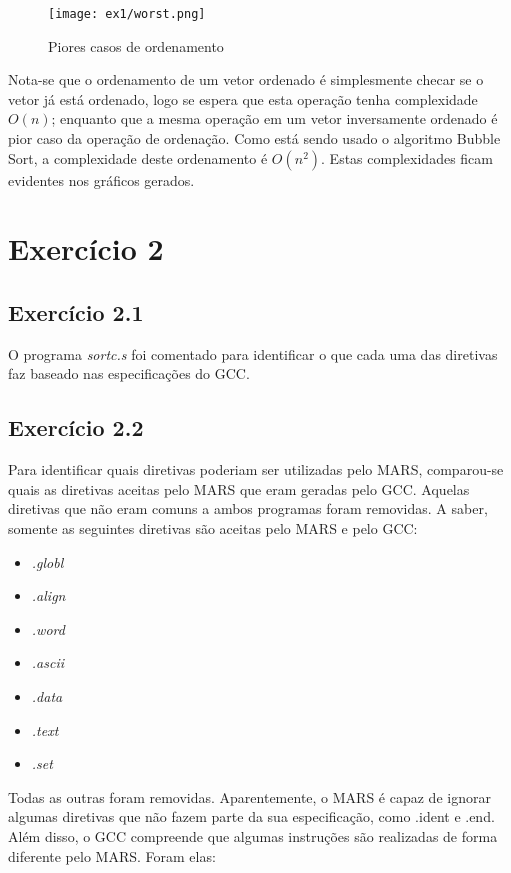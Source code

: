\documentclass[12pt, a4paper, twoside]{article}
\begin{document}
{\begin{figure}
    \centering
    \texttt{[image: ex1/worst.png]}
    \caption{Piores casos de ordenamento}
\end{figure}

Nota-se que o ordenamento de um vetor ordenado é simplesmente checar se o vetor já está ordenado, logo se espera que esta operação tenha complexidade $O(n)$; enquanto que a mesma operação em um vetor inversamente ordenado é pior caso da operação de ordenação. Como está sendo usado o algoritmo Bubble Sort, a complexidade deste ordenamento é $O(n^2)$. Estas complexidades ficam evidentes nos gráficos gerados.

\section{Exercício 2}

\subsection{Exercício 2.1}

O programa \textit{sortc.s} foi comentado para identificar o que cada uma das diretivas faz baseado nas especificações do GCC.

\subsection{Exercício 2.2}

Para identificar quais diretivas poderiam ser utilizadas pelo MARS, comparou-se quais as diretivas aceitas pelo MARS que eram geradas pelo GCC. Aquelas diretivas que não eram comuns a ambos programas foram removidas. A saber, somente as seguintes diretivas são aceitas pelo MARS e pelo GCC:

\begin{itemize}
    \item \textit{.globl}
    \item \textit{.align}
    \item \textit{.word}
    \item \textit{.ascii}
    \item \textit{.data}
    \item \textit{.text}
    \item \textit{.set}
\end{itemize}

Todas as outras foram removidas. Aparentemente, o MARS é capaz de ignorar algumas diretivas que não fazem parte da sua especificação, como .ident e .end. Além disso, o GCC compreende que algumas instruções são realizadas de forma diferente pelo MARS. Foram elas:

}
\end{document}
